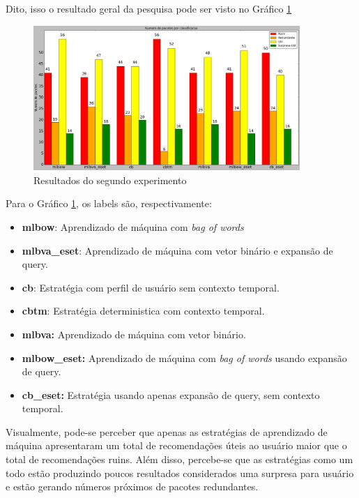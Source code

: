 Dito, isso o resultado geral da pesquisa pode ser visto no Gráfico
\ref{fig:segundo_experimento}

\begin{figure}[h]
  \centering
  \includegraphics[width=0.9\textwidth]{figuras/segundo_experimento.eps}
  \caption{Resultados do segundo experimento}
  \label{fig:segundo_experimento}
\end{figure}

Para o Gráfico \ref{fig:segundo_experimento}, os labels são, respectivamente:

\begin{itemize}
    \item \textbf{mlbow}: Aprendizado de máquina com \textit{bag of words}
    \item \textbf{mlbva\_eset}: Aprendizado de máquina com vetor binário e
    expansão de query.
    \item \textbf{cb}: Estratégia com perfil de usuário sem contexto temporal.
    \item \textbf{cbtm}: Estratégia deterministica com contexto temporal.
    \item \textbf{mlbva:} Aprendizado de máquina com vetor binário.
    \item \textbf{mlbow\_eset:} Aprendizado de máquina com \textit{bag of words}
        usando expansão de query.
    \item \textbf{cb\_eset:} Estratégia usando apenas expansão de query, sem
        contexto temporal.
\end{itemize}

Visualmente, pode-se perceber que apenas as estratégias de aprendizado de
máquina apresentaram um total de recomendações úteis ao usuário maior que o
total de recomendações ruins. Além disso, percebe-se que as estratégias como um
todo estão produzindo poucos resultados considerados uma surpresa para usuário e
estão gerando números próximos de pacotes redundantes.

